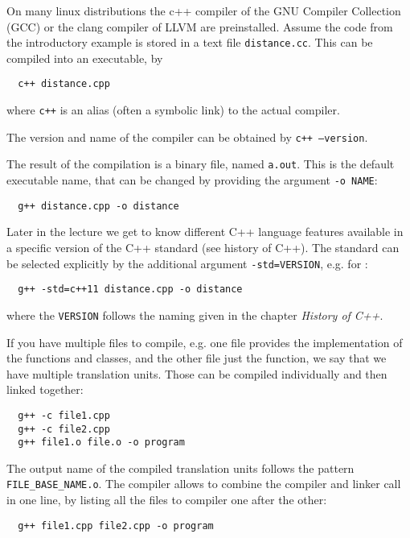 On many linux distributions the c++ compiler of the GNU Compiler Collection (GCC) or the clang compiler of LLVM are preinstalled.
Assume the code from the introductory example is stored in a text file \texttt{distance.cc}. This can be compiled into an executable, by
%
\begin{verbatim}
  c++ distance.cpp
\end{verbatim}
%
where \texttt{c++} is an alias (often a symbolic link) to the actual compiler.

\begin{rem}
  The version and name of the compiler can be obtained by \texttt{c++ --version}.
\end{rem}

The result of the compilation is a binary file, named \texttt{a.out}. This is the default executable name, that can be changed by
providing the argument \texttt{-o NAME}:
%
\begin{verbatim}
  g++ distance.cpp -o distance
\end{verbatim}
%
Later in the lecture we get to know different C++ language features available in a specific version of the C++ standard (see history of C++).
The standard can be selected explicitly by the additional argument \texttt{-std=VERSION}, e.g. for :
%
\begin{verbatim}
  g++ -std=c++11 distance.cpp -o distance
\end{verbatim}
%
where the \texttt{VERSION} follows the naming given in the chapter \emph{History of C++}.

If you have multiple files to compile, e.g. one file provides the implementation of the functions and classes, and the other file just
the  function, we say that we have multiple translation units. Those can be compiled individually and then linked together:
%
\begin{verbatim}
  g++ -c file1.cpp
  g++ -c file2.cpp
  g++ file1.o file.o -o program
\end{verbatim}
%
The output name of the compiled translation units follows the pattern \texttt{FILE\_BASE\_NAME.o}. The compiler allows to combine the compiler
and linker call in one line, by listing all the files to compiler one after the other:
%
\begin{verbatim}
  g++ file1.cpp file2.cpp -o program
\end{verbatim}

